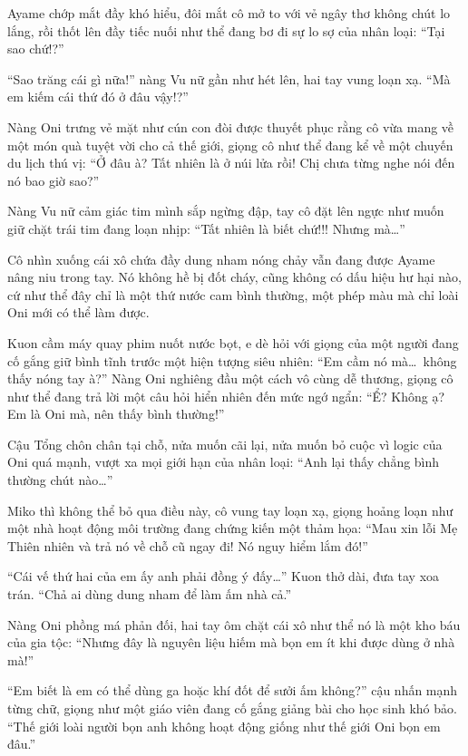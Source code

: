 \documentclass[../main.tex]{subfiles}
\begin{document}
Ayame chớp mắt đầy khó hiểu, đôi mắt cô mở to với vẻ ngây thơ không chút lo lắng, rồi thốt lên đầy tiếc nuối như thể đang bơ đi sự lo sợ của nhân loại: ``Tại sao chứ!?''

``Sao trăng cái gì nữa!'' nàng Vu nữ gần như hét lên, hai tay vung loạn xạ. ``Mà em kiếm cái thứ đó ở đâu vậy!?''

Nàng Oni trưng vẻ mặt như cún con đòi được thuyết phục rằng cô vừa mang về một món quà tuyệt vời cho cả thế giới, giọng cô như thể đang kể về một chuyến du lịch thú vị: ``Ở đâu à? Tất nhiên là ở núi lửa rồi! Chị chưa từng nghe nói đến nó bao giờ sao?''


Nàng Vu nữ cảm giác tim mình sắp ngừng đập, tay cô đặt lên ngực như muốn giữ chặt trái tim đang loạn nhịp: ``Tất nhiên là biết chứ!!! Nhưng mà\dots''

Cô nhìn xuống cái xô chứa đầy dung nham nóng chảy vẫn đang được Ayame nâng niu trong tay. Nó không hề bị đốt cháy, cũng không có dấu hiệu hư hại nào, cứ như thể đây chỉ là một thứ nước cam bình thường, một phép màu mà chỉ loài Oni mới có thể làm được.

Kuon cầm máy quay phim nuốt nước bọt, e dè hỏi với giọng của một người đang cố gắng giữ bình tĩnh trước một hiện tượng siêu nhiên: ``Em cầm nó mà\dots\ không thấy nóng tay à?'' Nàng Oni nghiêng đầu một cách vô cùng dễ thương, giọng cô như thể đang trả lời một câu hỏi hiển nhiên đến mức ngớ ngẩn: ``Ể? Không ạ? Em là Oni mà, nên thấy bình thường!''

Cậu Tổng chôn chân tại chỗ, nửa muốn cãi lại, nửa muốn bỏ cuộc vì logic của Oni quá mạnh, vượt xa mọi giới hạn của nhân loại: ``Anh lại thấy chẳng bình thường chút nào\dots''

Miko thì không thể bỏ qua điều này, cô vung tay loạn xạ, giọng hoảng loạn như một nhà hoạt động môi trường đang chứng kiến một thảm họa: ``Mau xin lỗi Mẹ Thiên nhiên và trả nó về chỗ cũ ngay đi! Nó nguy hiểm lắm đó!''

``Cái vế thứ hai của em ấy anh phải đồng ý đấy\dots'' Kuon thở dài, đưa tay xoa trán. ``Chả ai dùng dung nham để làm ấm nhà cả.''

Nàng Oni phồng má phản đối, hai tay ôm chặt cái xô như thể nó là một kho báu của gia tộc: ``Nhưng đây là nguyên liệu hiếm mà bọn em ít khi được dùng ở nhà mà!''

``Em biết là em có thể dùng ga hoặc khí đốt để sưởi ấm không?'' cậu nhấn mạnh từng chữ, giọng như một giáo viên đang cố gắng giảng bài cho học sinh khó bảo. ``Thế giới loài người bọn anh không hoạt động giống như thế giới Oni bọn em đâu.''
\end{document}
